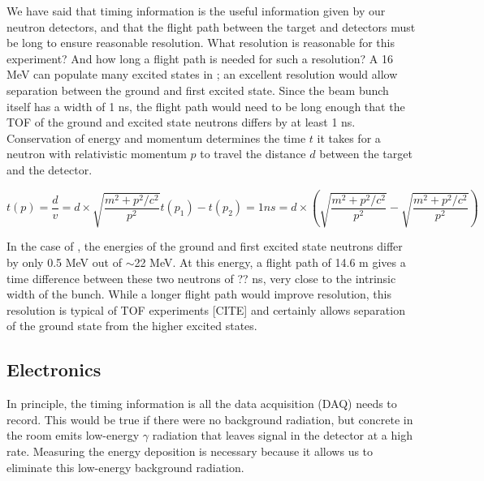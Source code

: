 
We have said that timing information is the useful information given by our neutron detectors, and that the flight path between the target and detectors must be long to ensure reasonable resolution.  What resolution is reasonable for this experiment?  And how long a flight path is needed for such a resolution?  A 16 MeV  can populate many excited states in \GeTargets; an excellent resolution would allow separation between the ground and first excited state.  Since the beam bunch itself has a width of 1 ns, the flight path would need to be long enough that the TOF of the ground and excited state neutrons differs by at least 1 ns. Conservation of energy and momentum determines the time $t$ it takes for a neutron with relativistic momentum $p$ to travel the distance $d$ between the target and the detector.


\begin{equation}
t(p) = \frac{d}{v} = d\times\sqrt{\frac{m^2+p^2/c^2}{p^2}}
t(p_1) - t(p_2) = 1 ns = d\times(\sqrt{\frac{m^2+p^2/c^2}{p^2}}-\sqrt{\frac{m^2+p^2/c^2}{p^2}})
\label{eq:TOF}
\end{equation}

In the case of ,  the energies of the ground and first excited state neutrons differ by only 0.5 MeV out of $\sim$22 MeV.  At this energy, a flight path of 14.6 m gives a time difference between these two neutrons of ?? ns, very close to the intrinsic width of the bunch.  While a longer flight path would improve resolution, this resolution is typical of TOF experiments [CITE] and certainly allows separation of the ground state from the higher excited states.  

\subsection{Electronics}

In principle, the timing information is all the data acquisition (DAQ) needs to record.  This would be true if there were no background radiation, but concrete in the room emits low-energy $\gamma$ radiation that leaves signal in the detector at a high rate.  Measuring the energy deposition is necessary because it allows us to eliminate this low-energy background radiation.

